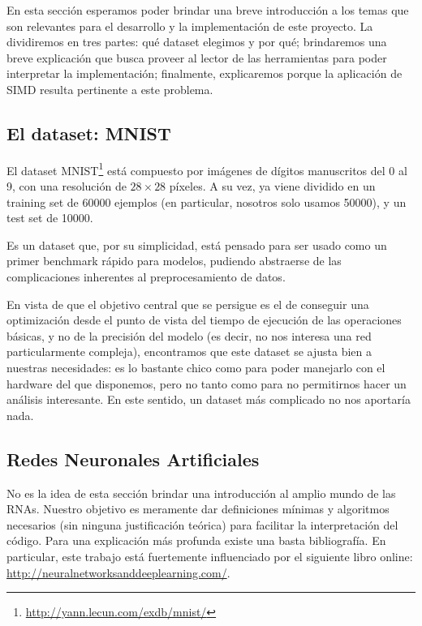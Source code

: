 En esta sección esperamos poder brindar una breve introducción a los temas que son relevantes para el desarrollo y la implementación de este proyecto. La dividiremos en tres partes: qué dataset elegimos y por qué; brindaremos una breve explicación que busca proveer al lector de las herramientas para poder interpretar la implementación; finalmente, explicaremos porque la aplicación de SIMD resulta pertinente a este problema.

\subsection{El dataset: MNIST}

El dataset MNIST\footnote{\url{http://yann.lecun.com/exdb/mnist/}} está compuesto por imágenes de dígitos manuscritos del 0 al 9, con una resolución de $28\times 28$ píxeles. A su vez, ya viene dividido en un training set de 60000 ejemplos (en particular, nosotros solo usamos 50000), y un test set de 10000.

Es un dataset que, por su simplicidad, está pensado para ser usado como un primer benchmark rápido para modelos, pudiendo abstraerse de las complicaciones inherentes al preprocesamiento de datos. 

En vista de que el objetivo central que se persigue es el de conseguir una optimización desde el punto de vista del tiempo de ejecución de las operaciones básicas, y no de la precisión del modelo (es decir, no nos interesa una red particularmente compleja), encontramos que este dataset se ajusta bien a nuestras necesidades: es lo bastante chico como para poder manejarlo con el hardware del que disponemos, pero no tanto como para no permitirnos hacer un análisis interesante. En este sentido, un dataset más complicado no nos aportaría nada.

\subsection{Redes Neuronales Artificiales}

No es la idea de esta sección brindar una introducción al amplio mundo de las RNAs. Nuestro objetivo es meramente dar definiciones mínimas y algoritmos necesarios (sin ninguna justificación teórica) para facilitar la interpretación del código. Para una explicación más profunda existe una basta bibliografía. En particular, este trabajo está fuertemente influenciado por el siguiente libro online: \url{http://neuralnetworksanddeeplearning.com/}.

